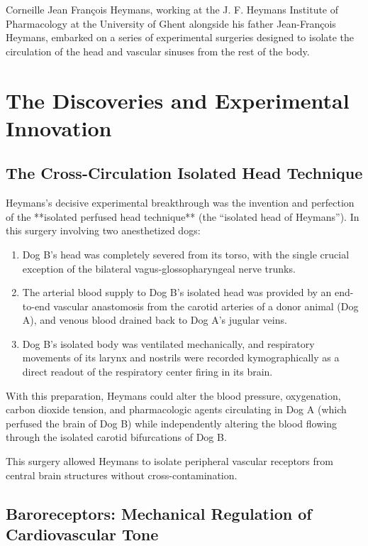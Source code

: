 Corneille Jean François Heymans, working at the J. F. Heymans Institute of Pharmacology at the University of Ghent alongside his father Jean-François Heymans, embarked on a series of experimental surgeries designed to isolate the circulation of the head and vascular sinuses from the rest of the body.

\section{The Discoveries and Experimental Innovation}

\subsection{The Cross-Circulation Isolated Head Technique}

Heymans's decisive experimental breakthrough was the invention and perfection of the **isolated perfused head technique** (the ``isolated head of Heymans''). In this surgery involving two anesthetized dogs:
\begin{enumerate}
    \item Dog B's head was completely severed from its torso, with the single crucial exception of the bilateral vagus-glossopharyngeal nerve trunks.
    \item The arterial blood supply to Dog B's isolated head was provided by an end-to-end vascular anastomosis from the carotid arteries of a donor animal (Dog A), and venous blood drained back to Dog A's jugular veins.
    \item Dog B's isolated body was ventilated mechanically, and respiratory movements of its larynx and nostrils were recorded kymographically as a direct readout of the respiratory center firing in its brain.
\end{enumerate}

With this preparation, Heymans could alter the blood pressure, oxygenation, carbon dioxide tension, and pharmacologic agents circulating in Dog A (which perfused the brain of Dog B) while independently altering the blood flowing through the isolated carotid bifurcations of Dog B. 

This surgery allowed Heymans to isolate peripheral vascular receptors from central brain structures without cross-contamination.

\subsection{Baroreceptors: Mechanical Regulation of Cardiovascular Tone}

